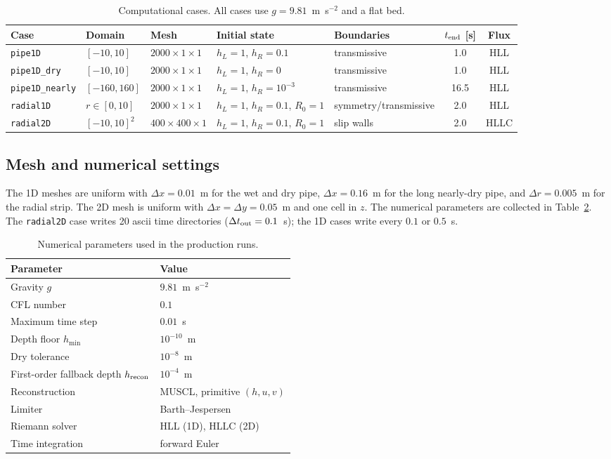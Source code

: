 ﻿\documentclass[11pt,a4paper]{article}
\newcommand{\dx}{\Delta x}
\newcommand{\dy}{\Delta y}
\newcommand{\dr}{\Delta r}
\begin{document}
\begin{table}[H]
\centering
\caption{Computational cases.  All cases use $g=9.81$~m~s$^{-2}$ and a flat
bed.}
\label{tab:cases}
\footnotesize
\setlength{\tabcolsep}{4pt}
\begin{tabular}{@{}l l l l l c c@{}}
\toprule
Case & Domain & Mesh & Initial state & Boundaries & $t_{\rm end}$ [s] & Flux\\
\midrule
\texttt{pipe1D} & $[-10,10]$ & $2000\times1\times1$ & $h_L=1$, $h_R=0.1$ &
transmissive & 1.0 & HLL\\
\texttt{pipe1D\_dry} & $[-10,10]$ & $2000\times1\times1$ & $h_L=1$, $h_R=0$ &
transmissive & 1.0 & HLL\\
\texttt{pipe1D\_nearly} & $[-160,160]$ & $2000\times1\times1$ &
$h_L=1$, $h_R=10^{-3}$ & transmissive & 16.5 & HLL\\
\texttt{radial1D} & $r\in[0,10]$ & $2000\times1\times1$ &
$h_L=1$, $h_R=0.1$, $R_0=1$ & symmetry/transmissive & 2.0 & HLL\\
\texttt{radial2D} & $[-10,10]^2$ & $400\times400\times1$ &
$h_L=1$, $h_R=0.1$, $R_0=1$ & slip walls & 2.0 & HLLC\\
\bottomrule
\end{tabular}
\end{table}

\subsection{Mesh and numerical settings}
The 1D meshes are uniform with $\dx=0.01$~m for the wet and dry pipe,
$\dx=0.16$~m for the long nearly-dry pipe, and $\dr=0.005$~m for the radial
strip.  The 2D mesh is uniform with $\dx=\dy=0.05$~m and one cell in $z$.
The numerical parameters are collected in Table~\ref{tab:params}.  The
\texttt{radial2D} case writes 20 ascii time directories ($\Delta t_{\rm out}=0.1$~s);
the 1D cases write every $0.1$ or $0.5$~s.

\begin{table}[H]
\centering
\caption{Numerical parameters used in the production runs.}
\label{tab:params}
\small
\begin{tabular}{@{}ll@{}}
\toprule
Parameter & Value\\
\midrule
Gravity $g$ & $9.81$~m~s$^{-2}$\\
CFL number & $0.1$\\
Maximum time step & $0.01$~s\\
Depth floor $h_{\min}$ & $10^{-10}$~m\\
Dry tolerance & $10^{-8}$~m\\
First-order fallback depth $h_{\rm recon}$ & $10^{-4}$~m\\
Reconstruction & MUSCL, primitive $(h,u,v)$\\
Limiter & Barth--Jespersen\\
Riemann solver & HLL (1D), HLLC (2D)\\
Time integration & forward Euler\\
\bottomrule
\end{tabular}
\end{table}
\end{document}
